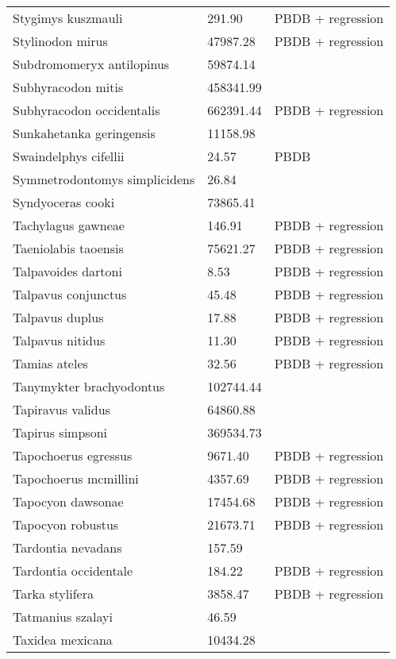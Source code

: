 \documentclass{article}
\begin{document}
\begin{center}
\begin{longtable}{p{} p{} p{} }
  Stygimys kuszmauli & 291.90 & PBDB + regression \\ 
  Stylinodon mirus & 47987.28 & PBDB + regression \\ 
  Subdromomeryx antilopinus & 59874.14 & \cite{Tomiya2013} \\ 
  Subhyracodon mitis & 458341.99 & \cite{Scott1940} \\ 
  Subhyracodon occidentalis & 662391.44 & PBDB + regression \\ 
  Sunkahetanka geringensis & 11158.98 & \cite{Tomiya2013} \\ 
  Swaindelphys cifellii & 24.57 & PBDB \\ 
  Symmetrodontomys simplicidens & 26.84 & \cite{Tomiya2013} \\ 
  Syndyoceras cooki & 73865.41 & \cite{Tomiya2013} \\ 
  Tachylagus gawneae & 146.91 & PBDB + regression \\ 
  Taeniolabis taoensis & 75621.27 & PBDB + regression \\ 
  Talpavoides dartoni & 8.53 & PBDB + regression \\ 
  Talpavus conjunctus & 45.48 & PBDB + regression \\ 
  Talpavus duplus & 17.88 & PBDB + regression \\ 
  Talpavus nitidus & 11.30 & PBDB + regression \\ 
  Tamias ateles & 32.56 & PBDB + regression \\ 
  Tanymykter brachyodontus & 102744.44 & \cite{Tomiya2013} \\ 
  Tapiravus validus & 64860.88 & \cite{Tomiya2013} \\ 
  Tapirus simpsoni & 369534.73 & \cite{Tomiya2013} \\ 
  Tapochoerus egressus & 9671.40 & PBDB + regression \\ 
  Tapochoerus mcmillini & 4357.69 & PBDB + regression \\ 
  Tapocyon dawsonae & 17454.68 & PBDB + regression \\ 
  Tapocyon robustus & 21673.71 & PBDB + regression \\ 
  Tardontia nevadans & 157.59 & \cite{Tomiya2013} \\ 
  Tardontia occidentale & 184.22 & PBDB + regression \\ 
  Tarka stylifera & 3858.47 & PBDB + regression \\ 
  Tatmanius szalayi & 46.59 & \cite{Ferrusquia-Villafranca2006} \\ 
  Taxidea mexicana & 10434.28 & \cite{Bloch2007} \\ 

\end{longtable}
\end{center}
\end{document}
